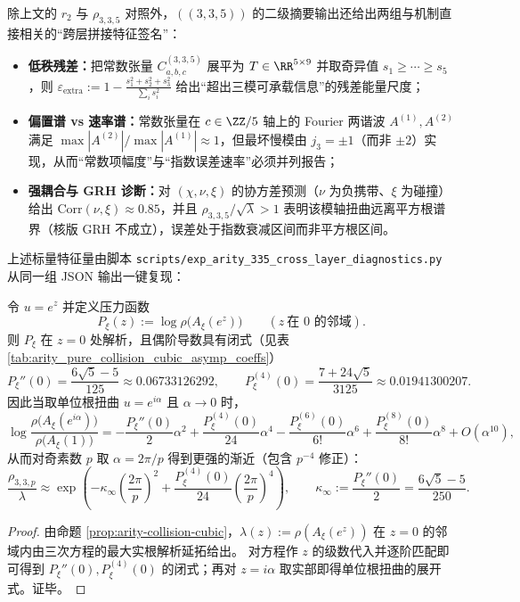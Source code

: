\begin{remark}\label{rem:arity-335-cross-layer-diagnostics}
除上文的 \(r_2\) 与 \(\rho_{3,3,5}\) 对照外，\(((3,3,5))\) 的二级摘要输出还给出两组与机制直接相关的“跨层拼接特征签名”：
\begin{itemize}
  \item \textbf{低秩残差：}把常数张量 \(C^{(3,3,5)}_{a,b,c}\) 展平为 \(T\in\RR^{5\times 9}\) 并取奇异值 \(s_1\ge\cdots\ge s_5\)，则
  \(
  \varepsilon_{\mathrm{extra}}
  :=1-\frac{s_1^2+s_2^2+s_3^2}{\sum_i s_i^2}
  \)
  给出“超出三模可承载信息”的残差能量尺度；
  \item \textbf{偏置谱 vs 速率谱：}常数张量在 \(c\in\ZZ/5\) 轴上的 Fourier 两谐波 \(A^{(1)},A^{(2)}\) 满足 \(\max|A^{(2)}|/\max|A^{(1)}|\approx 1\)，但最坏慢模由 \(j_3=\pm 1\)（而非 \(\pm 2\)）实现，从而“常数项幅度”与“指数误差速率”必须并列报告；
  \item \textbf{强耦合与 GRH 诊断：}对 \((\chi,\nu,\xi)\) 的协方差预测（\(\nu\) 为负携带、\(\xi\) 为碰撞）给出 \(\mathrm{Corr}(\nu,\xi)\approx 0.85\)，并且 \(\rho_{3,3,5}/\sqrt{\lambda}>1\) 表明该模轴扭曲远离平方根谱界（核版 GRH 不成立），误差处于指数衰减区间而非平方根区间。
\end{itemize}
上述标量特征量由脚本 \texttt{scripts/exp\_arity\_335\_cross\_layer\_diagnostics.py} 从同一组 JSON 输出一键复现：


\end{remark}

\begin{proposition}\label{prop:arity-collision-quadratic-closed}
令 \(u=e^{z}\) 并定义压力函数
$$
P_\xi(z):=\log\rho\bigl(A_\xi(e^{z})\bigr)\qquad(z\ \text{在 }0\text{ 的邻域}).
$$
则 \(P_\xi\) 在 \(z=0\) 处解析，且偶阶导数具有闭式（见表 \ref{tab:arity_pure_collision_cubic_asymp_coeffs}）
$$
P_\xi''(0)=\frac{6\sqrt5-5}{125}\approx 0.06733126292,
\qquad
P_\xi^{(4)}(0)=\frac{7+24\sqrt5}{3125}\approx 0.01941300207.
$$
因此当取单位根扭曲 \(u=e^{i\alpha}\) 且 \(\alpha\to 0\) 时，
$$
\log\frac{\rho\bigl(A_\xi(e^{i\alpha})\bigr)}{\rho\bigl(A_\xi(1)\bigr)}
=-\frac{P_\xi''(0)}{2}\alpha^2+\frac{P_\xi^{(4)}(0)}{24}\alpha^4-\frac{P_\xi^{(6)}(0)}{6!}\alpha^6+\frac{P_\xi^{(8)}(0)}{8!}\alpha^8+O(\alpha^{10}),
$$
从而对奇素数 \(p\) 取 \(\alpha=2\pi/p\) 得到更强的渐近（包含 \(p^{-4}\) 修正）：
$$
\frac{\rho_{3,3,p}}{\lambda}
\approx
\exp\!\left(
-\kappa_\infty\left(\frac{2\pi}{p}\right)^2+\frac{P_\xi^{(4)}(0)}{24}\left(\frac{2\pi}{p}\right)^4
\right),
\qquad
\kappa_\infty:=\frac{P_\xi''(0)}{2}=\frac{6\sqrt5-5}{250}.
$$
\end{proposition}

\begin{proof}
由命题 \ref{prop:arity-collision-cubic}，\(\lambda(z):=\rho(A_\xi(e^z))\) 在 \(z=0\) 的邻域内由三次方程的最大实根解析延拓给出。
对方程作 \(z\) 的级数代入并逐阶匹配即可得到 \(P_\xi''(0),P_\xi^{(4)}(0)\) 的闭式；再对 \(z=i\alpha\) 取实部即得单位根扭曲的展开式。证毕。
\end{proof}

